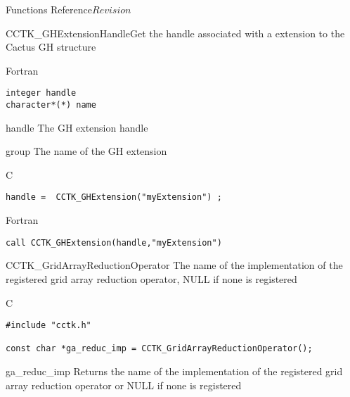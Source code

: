 \begin{cactuspart}{ Functions Reference}{}{$Revision$}
\begin{FunctionDescription}{CCTK\_GHExtensionHandle}{Get the handle associated with a extension to the Cactus GH structure}
\begin{SynopsisSection}
\begin{Synopsis}{Fortran}
\begin{verbatim}
integer handle
character*(*) name\end{verbatim}
\end{Synopsis}
\end{SynopsisSection}
\begin{ParameterSection}
\begin{Parameter}{handle}
The GH extension handle
\end{Parameter}
\begin{Parameter}{group}
The name of the GH extension
\end{Parameter}
\end{ParameterSection}

\begin{ExampleSection}
\begin{Example}{C}
\begin{verbatim}
handle =  CCTK_GHExtension("myExtension") ;
\end{verbatim}
\end{Example}
\begin{Example}{Fortran}
\begin{verbatim}
call CCTK_GHExtension(handle,"myExtension")
\end{verbatim}
\end{Example}
\end{ExampleSection}
\end{FunctionDescription}



\begin{FunctionDescription}{CCTK\_GridArrayReductionOperator}
\label{CCTK-GridArrayReductionOperator}
The name of the implementation of the registered grid array reduction operator, NULL if none is registered

\begin{SynopsisSection}
\begin{Synopsis}{C}
\begin{verbatim}
#include "cctk.h"

const char *ga_reduc_imp = CCTK_GridArrayReductionOperator();
\end{verbatim}
\end{Synopsis}
\end{SynopsisSection}

\begin{ResultSection}
\begin{Result}{ga\_reduc\_imp}
Returns the name of the implementation of the registered grid array reduction operator
or NULL if none is registered
\end{Result}
\end{ResultSection}



\end{FunctionDescription}
\end{cactuspart}
